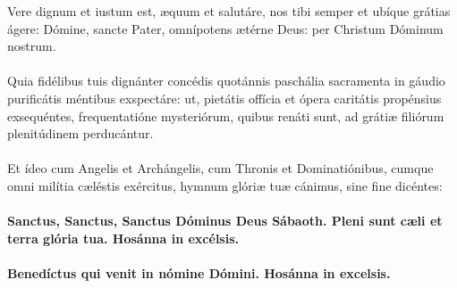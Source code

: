\documentclass[12pt, a4paper]{article}
\begin{document}
	\\
	\\
	\\
	\\
	\\
	Vere dignum et iustum est, æquum
	et salutáre, nos tibi semper et
	ubíque grátias ágere: Dómine,
	sancte Pater, omnípotens ætérne
	Deus: per Christum Dóminum
	nostrum.
	\\\\
	Quia fidélibus tuis dignánter
	concédis quotánnis paschália
	sacramenta in gáudio purificátis
	méntibus exspectáre: ut, pietátis
	offícia et ópera caritátis propénsius
	exsequéntes, frequentatióne
	mysteriórum, quibus renáti sunt,
	ad grátiæ filiórum plenitúdinem
	perducántur.
	\\\\
	Et ídeo cum Angelis et
	Archángelis, cum Thronis et
	Dominatiónibus, cumque omni
	milítia cæléstis exércitus, hymnum
	glóriæ tuæ cánimus, sine fine
	dicéntes:
	\\\\
	\textbf{Sanctus, Sanctus, Sanctus Dóminus
		Deus Sábaoth. Pleni sunt cæli et
		terra glória tua. Hosánna in
		excélsis.}
	\\\\
	\textbf{Benedíctus qui venit in nómine
		Dómini. Hosánna in excelsis.}
	
	\newpage
	
\end{document}
